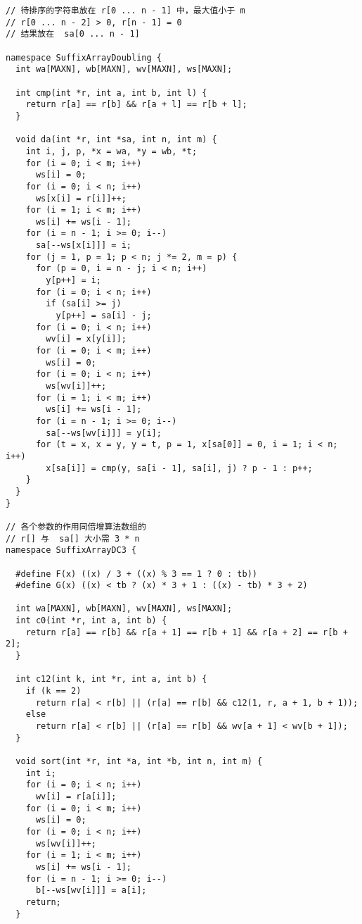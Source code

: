 \begin{lstlisting}
// 待排序的字符串放在 r[0 ... n - 1] 中，最大值小于 m
// r[0 ... n - 2] > 0, r[n - 1] = 0
// 结果放在  sa[0 ... n - 1]

namespace SuffixArrayDoubling {
  int wa[MAXN], wb[MAXN], wv[MAXN], ws[MAXN];

  int cmp(int *r, int a, int b, int l) {
    return r[a] == r[b] && r[a + l] == r[b + l];
  }

  void da(int *r, int *sa, int n, int m) {
    int i, j, p, *x = wa, *y = wb, *t;
    for (i = 0; i < m; i++)
      ws[i] = 0;
    for (i = 0; i < n; i++)
      ws[x[i] = r[i]]++;
    for (i = 1; i < m; i++)
      ws[i] += ws[i - 1];
    for (i = n - 1; i >= 0; i--)
      sa[--ws[x[i]]] = i;
    for (j = 1, p = 1; p < n; j *= 2, m = p) {
      for (p = 0, i = n - j; i < n; i++)
        y[p++] = i;
      for (i = 0; i < n; i++)
        if (sa[i] >= j)
          y[p++] = sa[i] - j;
      for (i = 0; i < n; i++)
        wv[i] = x[y[i]];
      for (i = 0; i < m; i++)
        ws[i] = 0;
      for (i = 0; i < n; i++)
        ws[wv[i]]++;
      for (i = 1; i < m; i++)
        ws[i] += ws[i - 1];
      for (i = n - 1; i >= 0; i--)
        sa[--ws[wv[i]]] = y[i];
      for (t = x, x = y, y = t, p = 1, x[sa[0]] = 0, i = 1; i < n; i++)
        x[sa[i]] = cmp(y, sa[i - 1], sa[i], j) ? p - 1 : p++;
    }
  }
}

// 各个参数的作用同倍增算法数组的
// r[] 与  sa[] 大小需 3 * n
namespace SuffixArrayDC3 {

  #define F(x) ((x) / 3 + ((x) % 3 == 1 ? 0 : tb))
  #define G(x) ((x) < tb ? (x) * 3 + 1 : ((x) - tb) * 3 + 2)

  int wa[MAXN], wb[MAXN], wv[MAXN], ws[MAXN];
  int c0(int *r, int a, int b) {
    return r[a] == r[b] && r[a + 1] == r[b + 1] && r[a + 2] == r[b + 2];
  }

  int c12(int k, int *r, int a, int b) {
    if (k == 2)
      return r[a] < r[b] || (r[a] == r[b] && c12(1, r, a + 1, b + 1));
    else
      return r[a] < r[b] || (r[a] == r[b] && wv[a + 1] < wv[b + 1]);
  }

  void sort(int *r, int *a, int *b, int n, int m) {
    int i;
    for (i = 0; i < n; i++)
      wv[i] = r[a[i]];
    for (i = 0; i < m; i++)
      ws[i] = 0;
    for (i = 0; i < n; i++)
      ws[wv[i]]++;
    for (i = 1; i < m; i++)
      ws[i] += ws[i - 1];
    for (i = n - 1; i >= 0; i--)
      b[--ws[wv[i]]] = a[i];
    return;
  }


\end{lstlisting}

